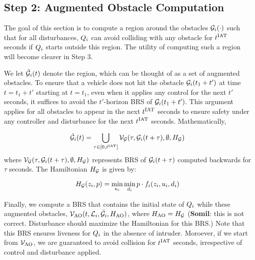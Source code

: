 \subsection{Step 2: Augmented Obstacle Computation \label{sec:intruder_aocomp}}
The goal of this section is to compute a region around the obstacles $\mathcal{G}_i(\cdot)$ such that for all disturbances, $Q_{i}$ can avoid colliding with any obstacle for $t^\text{IAT}$ seconds if $Q_{i}$ starts outside this region. The utility of computing such a region will become clearer in Step 3. 

We let $\tilde{\mathcal{G}}_i(t)$ denote the region, which can be thought of as a set of augmented obstacles. To ensure that a vehicle does not hit the obstacle $\mathcal{G}_i(t_1 + t')$ at time $t = t_1 + t'$ starting at $t = t_1$, even when it applies any control for the next $t'$ seconds, it suffices to avoid the $t'$-horizon BRS of $\mathcal{G}_i(t_1 + t')$. This argument applies for all obstacles to appear in the next $t^\text{IAT}$ seconds to ensure safety under any controller and disturbance for the next $t^\text{IAT}$ seconds. Mathematically,

\begin{equation} \label{eqn:inducedobs}
\tilde\obsset_i(t) = \bigcup_{\tau \in [0, \iat]} \brs_{\mathcal{G}}(\tau, \obsset_i(t+\tau), \emptyset, \ham_{\mathcal{G}})
\end{equation}
where $\mathcal{V}_{\mathcal{G}}(\tau, \mathcal{G}_i(t+\tau), \emptyset, H_{\mathcal{G}})$ represents BRS of $\mathcal{G}_i(t+\tau)$ computed backwards for $\tau$ seconds. The Hamiltonian 
$H_{\mathcal{G}}$ is given by:

\begin{equation} \label{eqn:BRSham}
\ham_{\mathcal{G}}(\state_i, p) = \min_{\ctrl_i} \min_{\dstb_i} p \cdot f_i (\state_i, \ctrl_i, \dstb_i)
\end{equation}

Finally, we compute a BRS that contains the initial state of $Q_{i}$ while these augmented obstacles, $\mathcal{V}_\text{AO}(t, \mathcal{L}_i, \bar{\mathcal{G}}_i, H_\text{AO})$, where $H_\text{AO} = H_{\mathcal{G}}$ (\textbf{Somil}: this is not correct. Disturbance should maximize the Hamiltonian for this BRS.) Note that this BRS ensures liveness for $Q_{i}$ in the absence of intruder. Moroever, if we start from $\mathcal{V}_\text{AO}$, we are guaranteed to avoid collision for $t^\text{IAT}$ seconds, irrespective of control and disturbance applied. 
